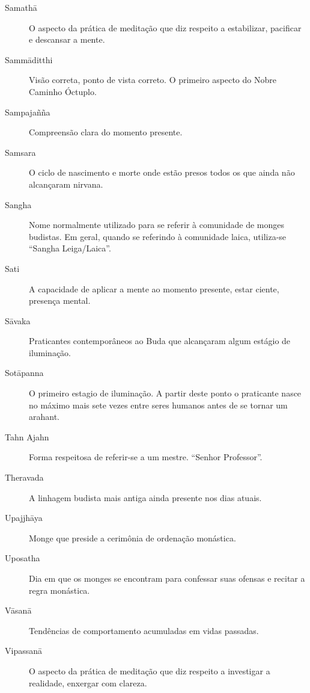 \begin{description}
  \item[Samathā] O aspecto da prática de meditação que diz respeito a estabilizar, pacificar e descansar a mente. 

  \item[Sammāditthi] Visão correta, ponto de vista correto. O primeiro aspecto do Nobre Caminho Óctuplo.

  \item[Sampajañña] Compreensão clara do momento presente.

  \item[Samsara] O ciclo de nascimento e morte onde estão presos todos os que ainda não alcançaram nirvana.

  \item[Sangha] Nome normalmente utilizado para se referir à comunidade de monges budistas. Em geral, quando se referindo à comunidade laica, utiliza-se “Sangha Leiga/Laica”.

  \item[Sati] A capacidade de aplicar a mente ao momento presente, estar ciente, presença mental. 

  \item[Sāvaka] Praticantes contemporâneos ao Buda que alcançaram algum estágio de iluminação. 

  \item[Sotāpanna] O primeiro estagio de iluminação. A partir deste ponto o praticante nasce no máximo mais sete vezes entre seres humanos antes de se tornar um arahant.

  \item[Tahn Ajahn] Forma respeitosa de referir-se a um mestre. “Senhor Professor”.

  \item[Theravada] A linhagem budista mais antiga ainda presente nos dias atuais.

  \item[Upajjhāya] Monge que preside a cerimônia de ordenação monástica. 

  \item[Uposatha] Dia em que os monges se encontram para confessar suas ofensas e recitar a regra monástica. 

  \item[Vāsanā] Tendências de comportamento acumuladas em vidas passadas. 

  \item[Vipassanā] O aspecto da prática de meditação que diz respeito a investigar a realidade, enxergar com clareza. 

\end{description}

